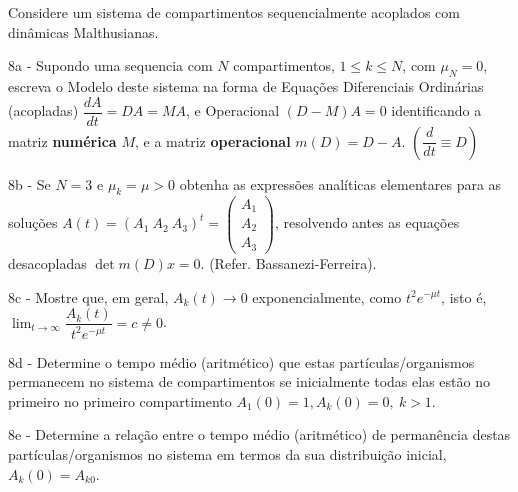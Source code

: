     Considere um sistema de compartimentos sequencialmente acoplados com dinâmicas Malthusianas.

    8a - Supondo uma sequencia com \(N\) compartimentos, \(1 \le k \le N\), com \(\mu_N = 0\), escreva o Modelo deste sistema na forma de Equações Diferenciais Ordinárias (acopladas) \(\dfrac{dA}{dt} = DA = MA\), e Operacional \((D - M)A = 0\) identificando a matriz \textbf{numérica} \(M\), e a matriz \textbf{operacional} \(m(D) = D - A\). \(\left(\dfrac{d}{dt} \equiv D\right)\)

    8b - Se \(N = 3\) e \(\mu_k = \mu > 0\) obtenha as expressões analíticas elementares para as soluções \(A(t) = (A_1 \ A_2 \ A_3)^t = \left(\begin{array}{c} A_1 \\ A_2 \\ A_3 \end{array}\right)\), resolvendo antes as equações desacopladas \(\det m(D) x = 0\). (Refer. Bassanezi-Ferreira).

    8c - Mostre que, em geral, \(A_k(t) \to 0\) exponencialmente, como \(t^2 e^{-\mu t}\), isto é, \(\displaystyle \lim_{t \to \infty} \dfrac{A_k(t)}{t^2 e^{-\mu t}} = c \neq 0\).

    8d - Determine o tempo médio (aritmético) que estas partículas/organismos permanecem no sistema de compartimentos se inicialmente todas elas estão no primeiro no primeiro compartimento \(A_1(0) = 1, A_k(0) = 0,\ k > 1\).

    8e - Determine a relação entre o tempo médio (aritmético) de permanência destas partículas/organismos no sistema em termos da sua distribuição inicial, \(A_k(0) = A_{k0}\).


